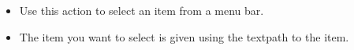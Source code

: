 \begin{itemize}
\item Use this action to select an item from a menu bar.
\item The item you want to select is given using the textpath to the item.
\end{itemize}
